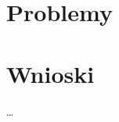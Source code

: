 \documentclass[declaration,shortabstract, mgr]{iithesis}
\begin{document}
\chapter{Problemy}
\chapter{Wnioski}

\ldots


\end{document}
